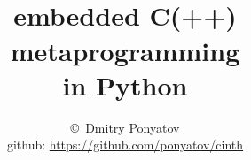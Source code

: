 

\title{\ \\embedded C(++) \\metaprogramming \\in Python}

\author{\copyright\ Dmitry Ponyatov \\
github: \url{https://github.com/ponyatov/cinth}}



\maketitle

\tableofcontents






